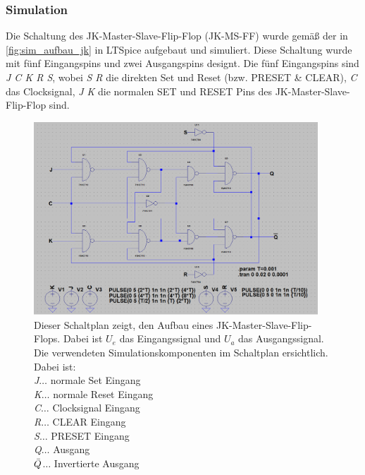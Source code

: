 \documentclass[12pt,english,ngerman]{scrartcl}
\begin{document}
\subsubsection{Simulation}

Die Schaltung des JK-Master-Slave-Flip-Flop (JK-MS-FF) wurde gemäß der
 in \autoref{fig:sim_aufbau_jk} in
LTSpice aufgebaut und simuliert. Diese Schaltung wurde mit fünf Eingangspins
und zwei Ausgangspins designt. Die fünf Eingangspins sind \textit{J C K R S},
wobei \textit{S R} die direkten Set und Reset (bzw. PRESET \& CLEAR), \textit{C} das
Clocksignal, \textit{J K} die normalen SET und RESET Pins des
JK-Master-Slave-Flip-Flop sind. 
\begin{figure}[H]
  \centering
  \includegraphics[width=0.95\textwidth]{./figures/sim/jk/aufbaujk.png}
    \caption{Dieser Schaltplan zeigt, den Aufbau eines
      JK-Master-Slave-Flip-Flops. Dabei ist $U_e$ das Eingangssignal und $U_a$
      das Ausgangssignal. Die verwendeten Simulationskomponenten im Schaltplan
      ersichtlich.
    Dabei ist:\\
    \textit{J}$\dots$ normale Set Eingang\\
    \textit{K}$\dots$ normale Reset Eingang\\
    \textit{C}$\dots$ Clocksignal Eingang\\
    \textit{R}$\dots$ CLEAR Eingang\\
    \textit{S}$\dots$ PRESET Eingang\\
    \textit{Q}$\dots$ Ausgang\\
    \textit{$\Bar{Q}$}$\dots$ Invertierte Ausgang\\
  }
  \label{fig:sim_aufbau_jk}
\end{figure}
\end{document}
